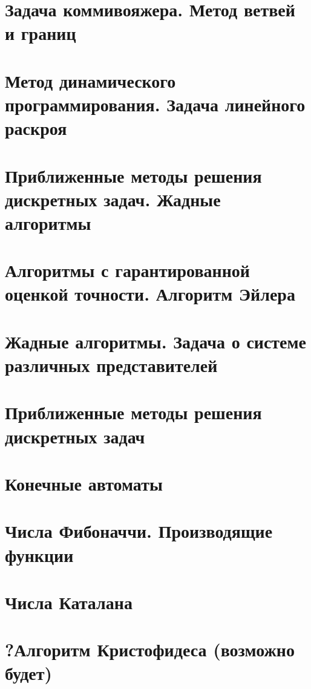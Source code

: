 \documentclass[12pt, fleqn]{article}
\begin{document}

\newpage

\section{Задача коммивояжера. Метод ветвей и границ}
\newpage

\section{Метод динамического программирования. Задача линейного раскроя}


\section{Приближенные методы решения дискретных задач. Жадные алгоритмы}


\section{Алгоритмы с гарантированной оценкой точности. Алгоритм Эйлера}


\section{Жадные алгоритмы. Задача о системе различных представителей}


\section{Приближенные методы решения дискретных задач}


\section{Конечные автоматы}


\section{Числа Фибоначчи. Производящие функции}


\section{Числа Каталана}


\section{?Алгоритм Кристофидеса (возможно будет)}
\end{document}
